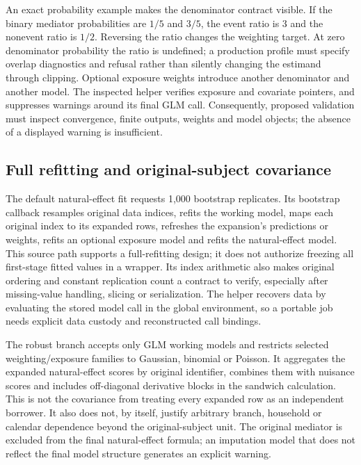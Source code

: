 An exact probability example makes the denominator contract visible. If
the binary mediator probabilities are $1/5$ and $3/5$, the event ratio is
3 and the nonevent ratio is $1/2$. Reversing the ratio changes the weighting
target. At zero denominator probability the ratio is undefined; a production
profile must specify overlap diagnostics and refusal rather than silently
changing the estimand through clipping. Optional exposure weights introduce
another denominator and another model. The inspected helper verifies exposure
and covariate pointers, and suppresses warnings around its final GLM call.
Consequently, proposed validation must inspect convergence, finite outputs,
weights and model objects; the absence of a displayed warning is insufficient.
\citep{exec23_medflex_sources,exec23_medflex_reference}

\subsection{Full refitting and original-subject covariance}
\label{exec23:medflex-uncertainty}
The default natural-effect fit requests 1,000 bootstrap replicates. Its
bootstrap callback resamples original data indices, refits the working model,
maps each original index to its expanded rows, refreshes the expansion's
predictions or weights, refits an optional exposure model and refits the
natural-effect model. This source path supports a full-refitting design;
it does not authorize freezing all first-stage fitted values in a wrapper.
Its index arithmetic also makes original ordering and constant replication
count a contract to verify, especially after missing-value handling, slicing
or serialization. The helper recovers data by evaluating the stored model
call in the global environment, so a portable job needs explicit data custody
and reconstructed call bindings.
\citep{exec23_medflex_sources}

The robust branch accepts only GLM working models and restricts selected
weighting/exposure families to Gaussian, binomial or Poisson. It aggregates
the expanded natural-effect scores by original identifier, combines them
with nuisance scores and includes off-diagonal derivative blocks in the
sandwich calculation. This is not the covariance from treating every expanded
row as an independent borrower. It also does not, by itself, justify arbitrary
branch, household or calendar dependence beyond the original-subject unit.
The original mediator is excluded from the final natural-effect formula;
an imputation model that does not reflect the final model structure generates
an explicit warning.
\citep{exec23_medflex_sources}

